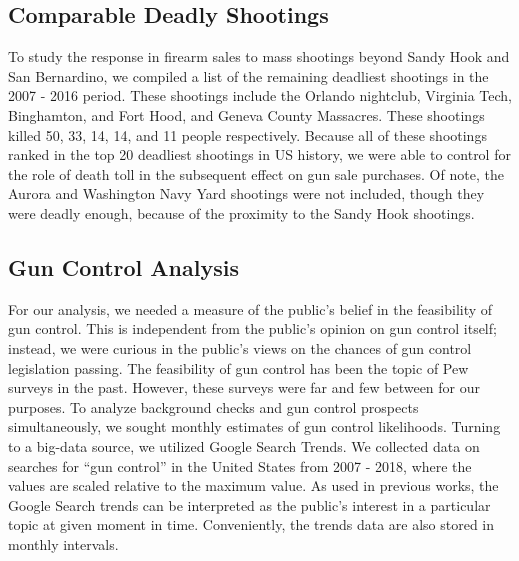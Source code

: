 \documentclass[9pt,twocolumn,twoside,lineno]{pnas-new}
\begin{document}
\subsection{Comparable Deadly Shootings}

	To study the response in firearm sales to mass shootings beyond Sandy Hook and San Bernardino, we compiled a list of the remaining deadliest shootings in the 2007 - 2016 period. These shootings include the Orlando nightclub, Virginia Tech, Binghamton, and Fort Hood, and Geneva County Massacres. These shootings killed 50, 33, 14, 14, and 11 people respectively. Because all of these shootings ranked in the top 20 deadliest shootings in US history, we were able to control for the role of death toll in the subsequent effect on gun sale purchases. 
	Of note, the Aurora and Washington Navy Yard shootings were not included, though they were deadly enough, because of the proximity to the Sandy Hook shootings. 
    
\subsection*{Gun Control Analysis}

For our analysis, we needed a measure of the public’s belief in the feasibility of gun control. This is independent from the public’s opinion on gun control itself; instead, we were curious in the public’s views on the chances of gun control legislation passing. The feasibility of gun control has been the topic of Pew surveys in the past. However, these surveys were far and few between for our purposes. To analyze background checks and gun control prospects simultaneously, we sought monthly estimates of gun control likelihoods. 
	Turning to a big-data source, we utilized Google Search Trends. We collected data on searches for “gun control” in the United States from 2007 - 2018, where the values are scaled relative to the maximum value. As used in previous works, the Google Search trends can be interpreted as the public’s interest in a particular topic at given moment in time. Conveniently, the trends data are also stored in monthly intervals. 
\end{document}
